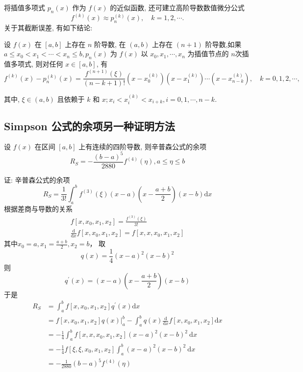 将插值多项式 $ p_{n}(x) $ 作为 $ f(x) $ 的近似函数, 还可建立高阶导数数值微分公式
$$
f^{(k)}(x) \approx p_{n}^{(k)}(x), \quad k=1,2, \cdots .
$$
关于其截断误差, 有如下结论:
\begin{tcolorbox}[enhanced,colback=2,colframe=1,breakable,coltitle=green!25!black,title=定理]
 设 $ f(x) $ 在 $ [a, b] $ 上存在 $ n $ 阶导数, 在 $ (a, b) $ 上存在 $ (n+1) $ 阶导数,如果 $ a \leqslant x_{0}<x_{1}<\cdots<x_{n} \leqslant b, p_{n}(x) $ 为 $ f(x) $ 以 $ x_{0}, x_{1}, \cdots, x_{n} $ 为插值节点的 $ n $次插值多项式, 则对任何 $ x \in[a, b] $, 有
$$
f^{(k)}(x)-p_{n}^{(k)}(x)=\frac{f^{(n+1)}(\xi)}{(n-k+1)!}\left(x-x_{0}^{(k)}\right)\left(x-x_{1}^{(k)}\right) \cdots\left(x-x_{n-k}^{(k)}\right), \quad k=0,1,2, \cdots,
$$

其中, $ \xi \in(a, b) $ 且依赖于 $ k $ 和 $ x ; x_{i}<x_{i}^{(k)}<x_{i+k}, i=0,1, \cdots, n-k $.
\end{tcolorbox}







\subsection{Simpson 公式的余项另一种证明方法}
 设 $ f(x) $ 在区间 $ [a, b] $ 上有连续的四阶导数, 则辛普森公式的余项
$$
R_{S}=-\frac{(b-a)^{5}}{2880} f^{(4)}(\eta), a \leqslant \eta \leqslant b
$$

证: 辛普森公式的余项
$$
R_{S}=\frac{1}{3!} \int_{a}^{b} f^{(3)}(\xi)(x-a)\left(x-\frac{a+b}{2}\right)(x-b) \mathrm{d} x
$$
根据差商与导数的关系
$$
\begin{array}{c}
f\left[x, x_{0}, x_{1}, x_{2}\right]=\frac{f^{(3)}(\xi)}{3!} \\
\frac{\mathrm{d}}{\mathrm{d} x} f\left[x, x_{0}, x_{1}, x_{2}\right]=f\left[x, x, x_{0}, x_{1}, x_{2}\right]
\end{array}
$$
其中$x_{0}=a, x_{1}=\frac{a+b}{2}, x_{2}=b$， 取
$$
q(x)=\frac{1}{4}(x-a)^{2}(x-b)^{2}
$$
则
$$
q^{\prime}(x)=(x-a)\left(x-\frac{a+b}{2}\right)(x-b)
$$
于是
$$
\begin{aligned}
R_{S} & =\int_{a}^{b} f\left[x, x_{0}, x_{1}, x_{2}\right] q^{\prime}(x) \mathrm{d} x \\
& =\left.f\left[x, x_{0}, x_{1}, x_{2}\right] q(x)\right|_{a} ^{b}-\int_{a}^{b} q(x) \frac{\mathrm{d}}{\mathrm{d} x} f\left[x, x_{0}, x_{1}, x_{2}\right] \mathrm{d} x \\
& =-\frac{1}{4} \int_{a}^{b} f\left[x, x, x_{0}, x_{1}, x_{2}\right](x-a)^{2}(x-b)^{2} \mathrm{~d} x \\
& =-\frac{1}{4} f\left[\xi, \xi, x_{0}, x_{1}, x_{2}\right] \int_{a}^{b}(x-a)^{2}(x-b)^{2} \mathrm{~d} x \\
& =-\frac{1}{2880}(b-a)^{5} f^{(4)}(\eta)
\end{aligned}
$$

